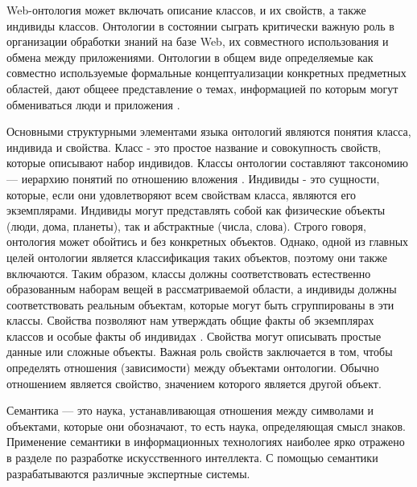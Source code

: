 Web-онтология может включать описание классов, и их свойств, а также индивиды классов. Онтологии в состоянии сыграть критически важную роль в организации обработки знаний на базе Web, их совместного использования и обмена между приложениями. Онтологии в общем виде определяемые как совместно используемые формальные концептуализации конкретных предметных областей, дают общеее представление о темах, информацией по которым могут обмениваться люди и приложения \cite{suarez2012ontology}. 

Основными структурными элементами языка онтологий являются понятия класса, индивида и свойства. Класс - это простое название и совокупность свойств, которые описывают набор индивидов. Классы онтологии составляют таксономию — иерархию понятий по отношению вложения \cite{lapshin2010ontology}. Индивиды - это сущности, которые, если они удовлетворяют всем свойствам класса, являются его экземплярами. Индивиды могут представлять собой как физические объекты (люди, дома, планеты), так и абстрактные (числа, слова). Строго говоря, онтология может обойтись и без конкретных объектов. Однако, одной из главных целей онтологии является классификация таких объектов, поэтому они также включаются. Таким образом, классы должны соответствовать естественно образованным наборам вещей в рассматриваемой области, а индивиды должны соответствовать реальным объектам, которые могут быть сгруппированы в эти классы. Свойства позволяют нам утверждать общие факты об экземплярах классов и особые факты об индивидах \cite{shumski2010preobraz}. Свойства могут описывать простые данные или сложные объекты. Важная роль свойств заключается в том, чтобы определять отношения (зависимости) между объектами онтологии. Обычно отношением является свойство, значением которого является другой объект.


Семантика — это наука, устанавливающая отношения между символами и объектами, которые они обозначают, то есть наука, определяющая смысл знаков. Применение семантики в информационных технологиях наиболее ярко отражено в разделе по разработке искусственного интеллекта. С помощью семантики разрабатываются различные экспертные системы.

